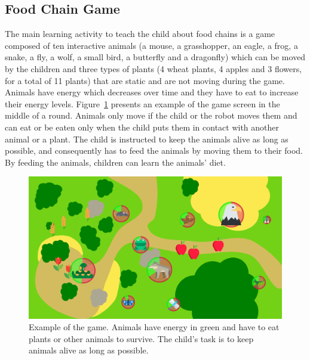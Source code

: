 \subsection{Food Chain Game}

The main learning activity to teach the child about food chains is a game composed of ten interactive animals (a mouse, a grasshopper, an eagle, a frog, a snake, a fly, a wolf, a small bird, a butterfly and a dragonfly) which can be moved by the children and three types of plants (4 wheat plants, 4 apples and 3 flowers, for a total of 11 plants) that are static and are not moving during the game. Animals have energy which decreases over time and they have to eat to increase their energy levels. Figure~\ref{fig:tutoring_game} presents an example of the game screen in the middle of a round. Animals only move if the child or the robot moves them and can eat or be eaten only when the child puts them in contact with another animal or a plant. The child is instructed to keep the animals alive as long as possible, and consequently has to feed the animals by moving them to their food. By feeding the animals, children can learn the animals' diet. 

\begin{figure}[ht]
	\centering
		\includegraphics[width=1\textwidth]{game.png}
		\caption{Example of the game. Animals have energy in green and have to eat plants or other animals to survive. The child's task is to keep animals alive as long as possible.}
		\label{fig:tutoring_game}
\end{figure}

